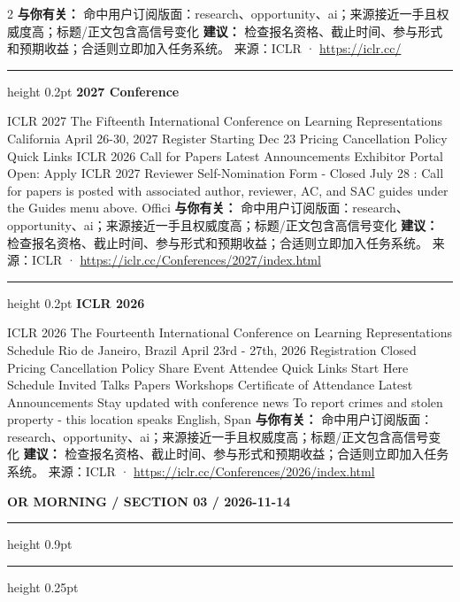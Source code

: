 \documentclass[10.5pt]{ctexart}
\begin{document}
\begin{multicols}{2}
\textbf{与你有关：} 命中用户订阅版面：research、opportunity、ai；来源接近一手且权威度高；标题/正文包含高信号变化
\textbf{建议：} 检查报名资格、截止时间、参与形式和预期收益；合适则立即加入任务系统。
{\footnotesize\color{ormuted} 来源：ICLR · \url{https://iclr.cc/}}
\vspace{2mm}
\hrule height 0.2pt
\vspace{2mm}
{\large\bfseries 2027 Conference}\par
ICLR 2027 The Fifteenth International Conference on Learning Representations California April 26-30, 2027 Register Starting Dec 23 Pricing Cancellation Policy Quick Links ICLR 2026 Call for Papers Latest Announcements Exhibitor Portal Open: Apply ICLR 2027 Reviewer Self-Nomination Form - Closed July 28 : Call for papers is posted with associated author, reviewer, AC, and SAC guides under the Guides menu above. Offici
\textbf{与你有关：} 命中用户订阅版面：research、opportunity、ai；来源接近一手且权威度高；标题/正文包含高信号变化
\textbf{建议：} 检查报名资格、截止时间、参与形式和预期收益；合适则立即加入任务系统。
{\footnotesize\color{ormuted} 来源：ICLR · \url{https://iclr.cc/Conferences/2027/index.html}}
\vspace{2mm}
\hrule height 0.2pt
\vspace{2mm}
{\large\bfseries ICLR 2026}\par
ICLR 2026 The Fourteenth International Conference on Learning Representations Schedule Rio de Janeiro, Brazil April 23rd - 27th, 2026 Registration Closed Pricing Cancellation Policy Share Event Attendee Quick Links Start Here Schedule Invited Talks Papers Workshops Certificate of Attendance Latest Announcements Stay updated with conference news To report crimes and stolen property - this location speaks English, Span
\textbf{与你有关：} 命中用户订阅版面：research、opportunity、ai；来源接近一手且权威度高；标题/正文包含高信号变化
\textbf{建议：} 检查报名资格、截止时间、参与形式和预期收益；合适则立即加入任务系统。
{\footnotesize\color{ormuted} 来源：ICLR · \url{https://iclr.cc/Conferences/2026/index.html}}
\end{multicols}
\newpage
{\small\bfseries OR MORNING / SECTION 03 / 2026-11-14}
\vspace{2mm}
\hrule height 0.9pt
\vspace{1.5mm}
\hrule height 0.25pt
\vspace{4mm}
\end{document}
